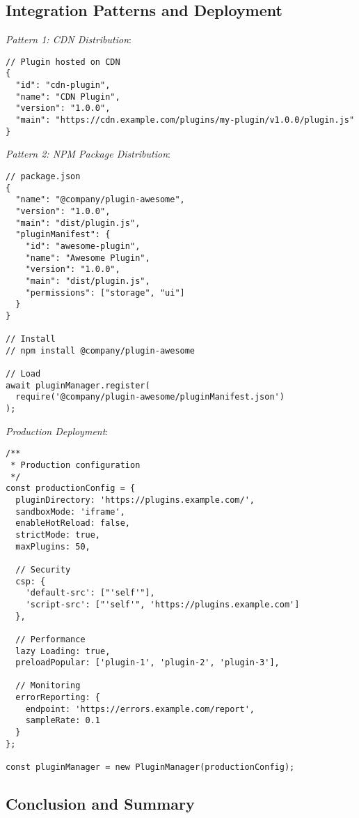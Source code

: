 \documentclass[11pt]{article}
\begin{document}
\subsection{Integration Patterns and Deployment}
\label{sec:orgbae192e}

\emph{Pattern 1: CDN Distribution}:

\begin{verbatim}
// Plugin hosted on CDN
{
  "id": "cdn-plugin",
  "name": "CDN Plugin",
  "version": "1.0.0",
  "main": "https://cdn.example.com/plugins/my-plugin/v1.0.0/plugin.js"
}
\end{verbatim}

\emph{Pattern 2: NPM Package Distribution}:

\begin{verbatim}
// package.json
{
  "name": "@company/plugin-awesome",
  "version": "1.0.0",
  "main": "dist/plugin.js",
  "pluginManifest": {
    "id": "awesome-plugin",
    "name": "Awesome Plugin",
    "version": "1.0.0",
    "main": "dist/plugin.js",
    "permissions": ["storage", "ui"]
  }
}

// Install
// npm install @company/plugin-awesome

// Load
await pluginManager.register(
  require('@company/plugin-awesome/pluginManifest.json')
);
\end{verbatim}

\emph{Production Deployment}:

\begin{verbatim}
/**
 * Production configuration
 */
const productionConfig = {
  pluginDirectory: 'https://plugins.example.com/',
  sandboxMode: 'iframe',
  enableHotReload: false,
  strictMode: true,
  maxPlugins: 50,
  
  // Security
  csp: {
    'default-src': ["'self'"],
    'script-src': ["'self'", 'https://plugins.example.com']
  },
  
  // Performance
  lazy Loading: true,
  preloadPopular: ['plugin-1', 'plugin-2', 'plugin-3'],
  
  // Monitoring
  errorReporting: {
    endpoint: 'https://errors.example.com/report',
    sampleRate: 0.1
  }
};

const pluginManager = new PluginManager(productionConfig);
\end{verbatim}
\subsection{Conclusion and Summary}
\label{sec:org49db865}
\end{document}
